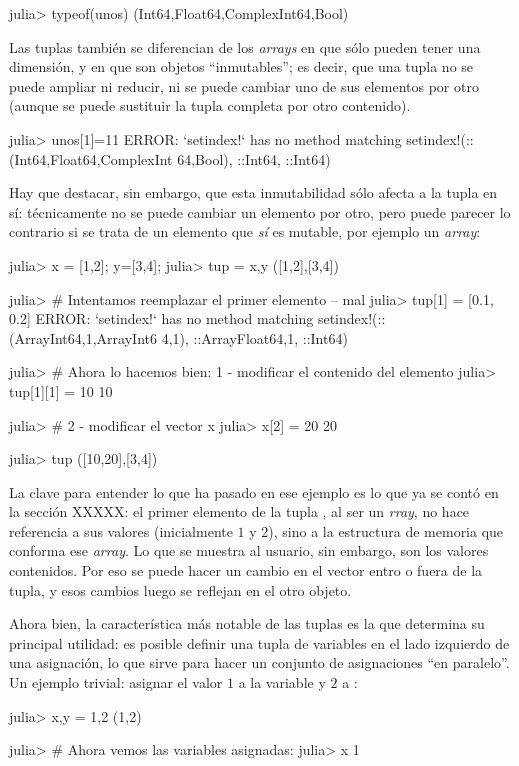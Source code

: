 ﻿\documentclass[spanish]{article}
\begin{document}
{{julia> typeof(unos)
(Int64,Float64,Complex{Int64},Bool)

Las tuplas también se diferencian de los \emph{arrays} en que sólo pueden tener una dimensión, y en que son objetos ``inmutables''; es decir, que una tupla no se puede ampliar ni reducir, ni se puede cambiar uno de sus elementos por otro (aunque se puede sustituir la tupla completa por otro contenido).

julia> unos[1]=11
ERROR: `setindex!` has no method matching setindex!(::(Int64,Float64,Complex{Int
64},Bool), ::Int64, ::Int64)

Hay que destacar, sin embargo, que esta inmutabilidad sólo afecta a la tupla en sí: técnicamente no se puede cambiar un elemento por otro, pero puede parecer lo contrario si se trata de un elemento que \emph{sí} es mutable, por ejemplo un \emph{array}:

julia> x = [1,2]; y=[3,4];
julia> tup = x,y
([1,2],[3,4])

julia> # Intentamos reemplazar el primer elemento -- mal
julia> tup[1] = [0.1, 0.2]
ERROR: `setindex!` has no method matching setindex!(::(Array{Int64,1},Array{Int6
4,1}), ::Array{Float64,1}, ::Int64)

julia> # Ahora lo hacemos bien: 1 - modificar el contenido del elemento
julia> tup[1][1] = 10
10

julia> # 2 - modificar el vector x
julia> x[2] = 20
20

julia> tup
([10,20],[3,4])

La clave para entender lo que ha pasado en ese ejemplo es lo que ya se contó en la sección XXXXX: el primer elemento de la tupla , al ser un \emph{rray}, no hace referencia a sus valores (inicialmente $1$ y $2$), sino a la estructura de memoria que conforma ese \emph{array}. Lo que se muestra al usuario, sin embargo, son los valores contenidos. Por eso se puede hacer un cambio en el vector entro o fuera de la tupla, y esos cambios luego se reflejan en el otro objeto.

Ahora bien, la característica más notable de las tuplas es la que determina su principal utilidad: es posible definir una tupla de variables en el lado izquierdo de una asignación, lo que sirve para hacer un conjunto de asignaciones ``en paralelo''. Un ejemplo trivial: asignar el valor $1$ a la variable  y $2$ a :

julia> x,y = 1,2
(1,2)

julia> # Ahora vemos las variables asignadas:
julia> x
1

}}
\end{document}
